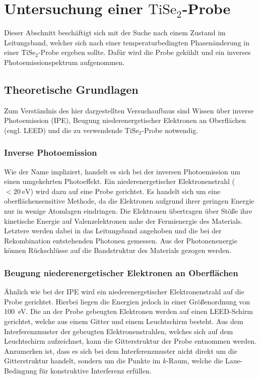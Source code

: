\clearpage
\section{Untersuchung einer $\text{TiSe}_2$-Probe}
\label{sec:thijs2}

Dieser Abschnitt beschäftigt sich mit der Suche nach einem Zustand im Leitungsband, welcher sich nach einer temperaturbedingten Phasenänderung in einer $\text{TiSe}_2$-Probe ergeben sollte.
Dafür wird die Probe gekühlt und ein inverses Photoemissionspektrum aufgenommen.

\subsection{Theoretische Grundlagen}
\label{sec:theo1}

Zum Verständnis des hier dargestellten Versuchaufbaus sind Wissen über inverse Photoemission (IPE), Beugung niederenergetischer Elektronen an Oberflächen (engl. LEED) und die zu verwendende $\text{TiSe}_2$-Probe notwendig.

\subsubsection{Inverse Photoemission}

Wie der Name impliziert, handelt es sich bei der inversen Photoemission um einen umgekehrten Photoeffekt.
Ein niederenergetischer Elektronenstrahl ($<\SI{20}{\electronvolt}$\cite{wiki_ipe}) wird dazu auf eine Probe gerichtet.
Es handelt sich um eine oberflächensensitive Methode, da die Elektronen aufgrund ihrer geringen Energie nur in wenige Atomlagen eindringen.
Die Elektronen übertragen über Stöße ihre kinetische Energie auf Valenzelektronen nahe der Fermienergie des Materials.
Letztere werden dabei in das Leitungsband angehoben und die bei der Rekombination entstehenden Photonen gemessen.
Aus der Photonenenergie können Rückschlüsse auf die Bandstruktur des Materials gezogen werden.

\subsubsection{Beugung niederenergetischer Elektronen an Oberflächen}

Ähnlich wie bei der IPE wird ein niederenergetischer Elektronenstrahl auf die Probe gerichtet.
Hierbei liegen die Energien jedoch in einer Größenordnung von \SI{100}{\electronvolt}\cite{wiki_leed}.
Die an der Probe gebeugten Elektronen werden auf einen LEED-Schirm gerichtet, welche aus einem Gitter und einem Leuchtschirm besteht.
Aus dem Interferenzmuster der gebeugten Elektronenstrahlen, welches sich auf dem Leuchtschirm aufzeichnet, kann die Gitterstruktur der Probe entnommen werden.
Anzumerken ist, dass es sich bei dem Interferenzmuster nicht direkt um die Gitterstruktur handelt, sondern um die Punkte im $k$-Raum, welche die Laue-Bedingung für konstruktive Interferenz erfüllen.

